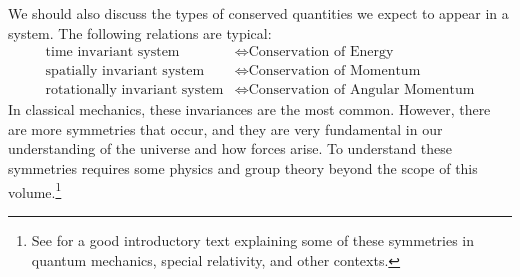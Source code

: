 We should also discuss the types of conserved quantities we expect to appear in a system. The following relations are typical:
\begin{align}
       \text{time invariant system}&\Leftrightarrow\text{Conservation of Energy}\\
    \text{spatially invariant system}&\Leftrightarrow  \text{Conservation of Momentum}\\
    \text{rotationally invariant system}&\Leftrightarrow \text{Conservation of Angular Momentum}
\end{align}
In classical mechanics, these invariances are the most common. However, there are more symmetries that occur, and they are very fundamental in our understanding of the universe and how forces arise. To understand these symmetries requires some physics and group theory beyond the scope of this volume.\footnote{See \cite{zee_quantum_2025} for a good introductory text explaining some of these symmetries in quantum mechanics, special relativity, and other contexts.}


